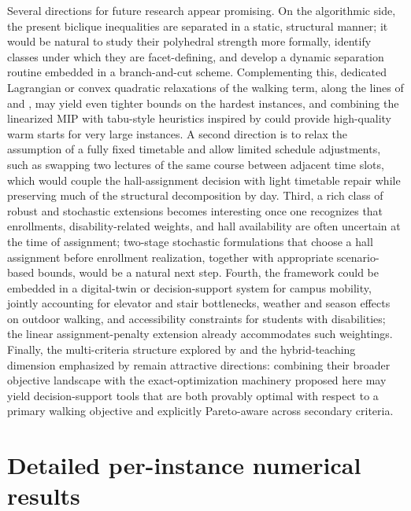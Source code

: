 \documentclass[11pt]{article}
\begin{document}
Several directions for future research appear promising. On the algorithmic side, the present biclique inequalities are separated in a static, structural manner; it would be natural to study their polyhedral strength more formally, identify classes under which they are facet-defining, and develop a dynamic separation routine embedded in a branch-and-cut scheme. Complementing this, dedicated Lagrangian or convex quadratic relaxations of the walking term, along the lines of \citet{anstreicher2003} and \citet{zhao1998}, may yield even tighter bounds on the hardest instances, and combining the linearized MIP with tabu-style heuristics inspired by \citet{taillard1991} could provide high-quality warm starts for very large instances. A second direction is to relax the assumption of a fully fixed timetable and allow limited schedule adjustments, such as swapping two lectures of the same course between adjacent time slots, which would couple the hall-assignment decision with light timetable repair while preserving much of the structural decomposition by day. Third, a rich class of robust and stochastic extensions becomes interesting once one recognizes that enrollments, disability-related weights, and hall availability are often uncertain at the time of assignment; two-stage stochastic formulations that choose a hall assignment before enrollment realization, together with appropriate scenario-based bounds, would be a natural next step. Fourth, the framework could be embedded in a digital-twin or decision-support system for campus mobility, jointly accounting for elevator and stair bottlenecks, weather and season effects on outdoor walking, and accessibility constraints for students with disabilities; the linear assignment-penalty extension already accommodates such weightings. Finally, the multi-criteria structure explored by \citet{roomalloc2026} and the hybrid-teaching dimension emphasized by \citet{davison2025} remain attractive directions: combining their broader objective landscape with the exact-optimization machinery proposed here may yield decision-support tools that are both provably optimal with respect to a primary walking objective and explicitly Pareto-aware across secondary criteria.




\appendix

\section{Detailed per-instance numerical results}
\label{app:per-instance}
\end{document}
